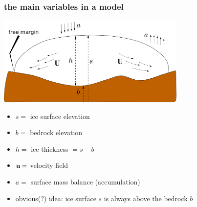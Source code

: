 \documentclass[10pt,hyperref={pdfpagelabels=true}]{beamer}
\begin{document}
\begin{frame}
  \frametitle{the main variables in a model}

\begin{center}
\includegraphics[width=0.7\textwidth]{groundedscheme}
\end{center}

\begin{itemize}
\small
\item $s=$ ice surface elevation
\item $b=$ bedrock elevation
\item $h=$ ice thickness $ = s-b$
\item ${\bf u}=$ velocity field
\item $a=$ surface mass balance (accumulation)

\bigskip
\item obvious(?) idea: ice surface $s$ is always above the bedrock $b$
\end{itemize}

\end{frame}
\end{document}
